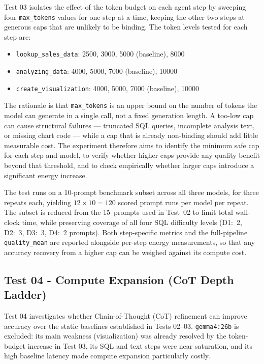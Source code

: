 Test 03 isolates the effect of the token budget on each agent step by sweeping
four \texttt{max\_tokens} values for one step at a time, keeping the other two
steps at generous caps that are unlikely to be binding. The token levels tested
for each step are:

\begin{itemize}
    \item \texttt{lookup\_sales\_data}: 2500, 3000, 5000 (baseline), 8000
    \item \texttt{analyzing\_data}: 4000, 5000, 7000 (baseline), 10000
    \item \texttt{create\_visualization}: 4000, 5000, 7000 (baseline), 10000
\end{itemize}

The rationale is that \texttt{max\_tokens} is an upper bound on the number of
tokens the model can generate in a single call, not a fixed generation length.
A too-low cap can cause structural failures --- truncated SQL queries, incomplete
analysis text, or missing chart code --- while a cap that is already non-binding
should add little measurable cost. The experiment therefore aims to identify the
minimum safe cap for each step and model, to verify whether higher caps provide
any quality benefit beyond that threshold, and to check empirically whether
larger caps introduce a significant energy increase.

The test runs on a 10-prompt benchmark subset across all three models, for three
repeats each, yielding $12 \times 10 = 120$ scored prompt runs per model per
repeat. The subset is reduced from the 15~prompts used in Test~02 to limit
total wall-clock time, while preserving coverage of all four SQL difficulty
levels (D1:~2, D2:~3, D3:~3, D4:~2 prompts). Both step-specific metrics and the full-pipeline \texttt{quality\_mean}
are reported alongside per-step energy measurements, so that any accuracy
recovery from a higher cap can be weighed against its compute cost.

\subsection{Test 04 - Compute Expansion (CoT Depth Ladder)}
\label{subsec:test04}

Test 04 investigates whether Chain-of-Thought (CoT) refinement can improve
accuracy over the static baselines established in Tests 02--03.
\texttt{gemma4:26b} is excluded: its main weakness (visualization) was already
resolved by the token-budget increase in Test 03, its SQL and text steps were
near saturation, and its high baseline latency made compute expansion
particularly costly.

